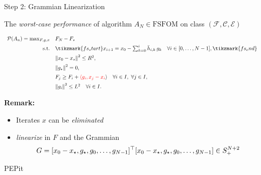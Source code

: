 \documentclass[9pt]{beamer}
\begin{document}
\begin{frame}{Step 2: Grammian Linearization}

  The \emph{worst-case performance} of algorithm $A_N \in \text{FSFOM}$ on class $(\mathcal{F},\mathcal{C},\mathcal{E})$
  \begin{tcolorbox}[colback=black!8, colframe=black!8, boxrule=0pt,
    arc=2pt, left=4pt, right=4pt, top=2pt, bottom=2pt]
  \[
    \begin{array}{rl}
     \mc P(A_n)= \max_{F, g, x} &   F_N-F_\star \\[0.5em]
      \st  & \tikzmark{fs_start}x_{i+1} = x_0 - \sum_{k=0}^{i} \bar h_{i,k} \, g_k \quad \forall i\in [0,\dots, N-1], \tikzmark{fs_end}\\[0.5em]
                  & \norm{x_0-x_\star}^2\leq R^2,\\[0.5em]
                  & \norm{g_\star}^2  = 0,\\[0.5em]
                       & F_j \geq F_i + {\color{red}\langle g_i, x_j-x_i} \rangle \quad \forall i\in I,~ \forall j\in I,\\[0.5em]
                       & \norm{g_i}^2\leq L^2 \quad \forall i \in I.
    \end{array}    
  \]
\end{tcolorbox}

  
  \vfill

  \textbf{Remark:}
  \begin{itemize}
  \item Iterates $x$ can be \emph{eliminated}
  \item \emph{linearize} in $F$ and the Grammian
    \[
      G = [x_0-x_\star, g_\star, g_0, \dots, g_{N-1}]^\top [x_0-x_\star, g_\star, g_0, \dots, g_{N-1}] \in S^{N+2}_+
    \]
  \end{itemize}
\end{frame}

\begin{frame}{PEPit}

\end{frame}
\end{document}
